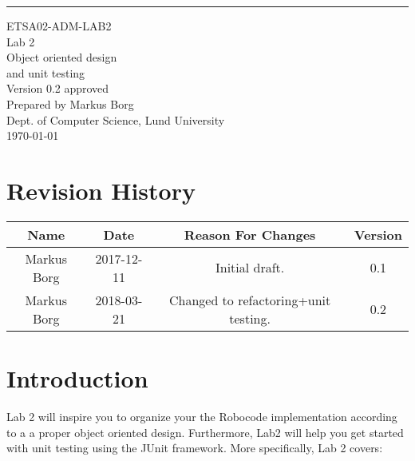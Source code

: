 \documentclass{scrreprt}
\date{}
\def\myversion{0.2 }
\begin{document}
\begin{flushright}
    \rule{16cm}{5pt}\vskip1cm
    \begin{bfseries}
    	\LARGE{ETSA02-ADM-LAB2}\\
    	\vspace{1.5cm}
        \Huge{Lab 2}\\
        \vspace{0.5cm}
        Object oriented design\\
        \vspace{0.5cm}
        and unit testing\\
        \vspace{1.5cm}
        \LARGE{Version \myversion approved}\\
        \vspace{1.5cm}
        Prepared by Markus Borg\\
        Dept. of Computer Science, Lund University\\
        \vspace{1.5cm}
        \today\\
    \end{bfseries}
\end{flushright}


\chapter*{Revision History}

\begin{center}
    \begin{tabular}{|c|c|c|c|}
        \hline
	    Name & Date & Reason For Changes & Version\\
        \hline
	    Markus Borg & 2017-12-11 & Initial draft. & 0.1\\
        \hline
        Markus Borg & 2018-03-21 & Changed to refactoring+unit testing. & 0.2\\
        \hline
    \end{tabular}
\end{center}

\chapter{Introduction}
Lab 2 will inspire you to organize your the Robocode implementation according to a a proper object oriented design. Furthermore, Lab2 will help you get started with unit testing using the JUnit framework. More specifically, Lab 2 covers:
\end{document}
